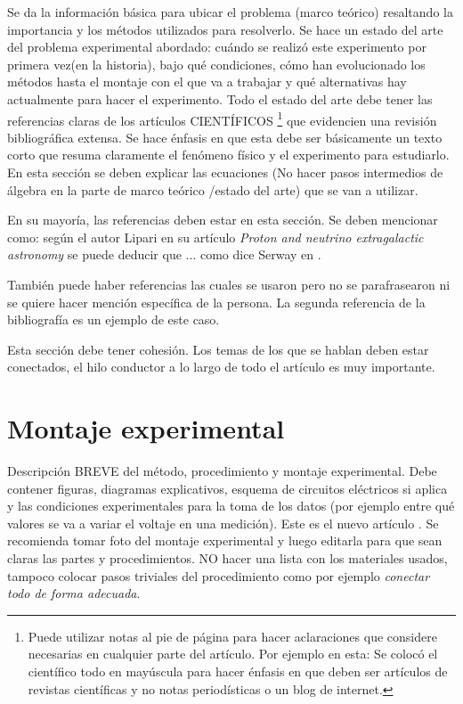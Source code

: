 \documentclass[a4paper, amsfonts, amssymb, amsmath, reprint, showkeys, nofootinbib, twoside]{revtex4-1}
\begin{document}
Se da la información básica para ubicar el problema (marco teórico) resaltando la importancia y los métodos utilizados para resolverlo. Se hace un estado del arte del problema experimental abordado: cuándo se realizó este experimento por primera vez(en la historia), bajo qué condiciones, cómo han evolucionado los métodos hasta el montaje con el que va a trabajar y qué alternativas hay actualmente para hacer el experimento. Todo el estado del arte debe tener las referencias claras de los artículos CIENTÍFICOS \footnote{Puede utilizar notas al pie de página para hacer aclaraciones que considere necesarias en cualquier parte del artículo. Por ejemplo en esta: Se colocó el científico todo en mayúscula para hacer énfasis en que deben ser artículos de revistas científicas y no notas periodísticas o un blog de internet.} que evidencien una revisión bibliográfica extensa. Se hace énfasis en que esta debe ser básicamente un texto corto que resuma claramente el fenómeno físico y el experimento para estudiarlo. En esta  sección se deben explicar las ecuaciones (No hacer pasos intermedios de álgebra en la parte de marco teórico /estado del arte) que se van a utilizar.

En su mayoría, las referencias deben estar en esta sección. Se deben mencionar como: según el autor Lipari \cite{Articulo1} en su artículo \emph{Proton and neutrino extragalactic astronomy} se puede deducir que $\dots$ como dice Serway en \cite{serway2006fisica}.

También puede haber referencias las cuales se usaron pero no se parafrasearon ni se quiere hacer mención específica de la persona. \nocite{Articulo2} La segunda referencia de la bibliografía es un ejemplo de este caso.

Esta sección debe tener cohesión. Los temas de los que se hablan deben estar conectados, el hilo conductor a lo largo de todo el artículo es muy importante.

\section{Montaje experimental}

Descripción BREVE del método, procedimiento y montaje  experimental. Debe contener figuras, diagramas explicativos, esquema de circuitos eléctricos si aplica y las condiciones experimentales para la toma de los datos (por ejemplo entre qué valores se va a variar el voltaje en una medición). Este es el nuevo artículo \cite{Flectcher1994}. Se recomienda tomar foto del montaje experimental y luego editarla para que sean claras las partes y procedimientos. NO hacer una lista con los materiales usados, tampoco colocar pasos triviales del procedimiento como por ejemplo \emph{conectar todo de forma adecuada}.
\end{document}
